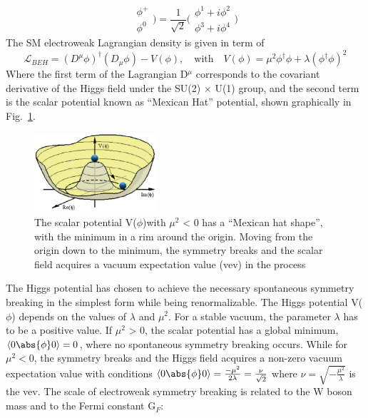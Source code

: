 \begin{itemize}
\begin{equation}
\begin{array}{c}
\phi^{+}\\
\phi^{0} \end{array}\Big)
= \frac{1}{\sqrt{2}}
\Big(\begin{array}{c}
\phi^{1} + i\phi^{2}\\
\phi^{3} + i\phi^{4}
\end{array}\Big)
\end{equation}
The SM electroweak Lagrangian density is given in term of
\begin{equation}\label{eq:beh_lagrange}
\mathcal{L}_{BEH} = (D^{\mu}\phi)^{\dagger}(D_{\mu}\phi) - V(\phi), \quad \textrm{with}\quad 
        V(\phi) = \mu^{2}\phi^{\dagger}\phi + \lambda(\phi^{\dagger}\phi)^{2}
\end{equation}
Where the first term of the Lagrangian D$^{\mu}$ corresponds to the covariant derivative of the Higgs field under the SU(2) $\times$ U(1) group, and the second term is the scalar potential known as ``Mexican Hat'' potential, shown graphically in Fig.~\ref{fig:mexican_hat}. 
\begin{figure}[h]
\centering
\captionsetup{width=0.8\linewidth}
\includegraphics[width=0.4\textwidth]{fig/sm_beyond/mexican_hat.png}
\caption{\label{fig:mexican_hat}The scalar potential V($\phi$)with $\mu^{2}$ < 0 has a ``Mexican hat shape'', with the minimum in a rim around the origin. Moving from the origin down to the minimum, the symmetry breaks and the scalar field acquires a vacuum expectation value (vev) in the process}
\end{figure}
The Higgs potential has chosen to achieve the necessary spontaneous symmetry breaking in the simplest form while being renormalizable. The Higgs potential V($\phi$) depends on the values of $\lambda$ and $\mu^{2}$. For a stable vacuum, the parameter $\lambda$ has to be a positive value. If $\mu^{2}$ > 0, the scalar potential has a global minimum, $\langle 0\abs{\phi}0\rangle = 0$, where no spontaneous symmetry breaking occurs. While for $\mu^{2} < 0$, the symmetry breaks and the Higgs field acquires a non-zero vacuum expectation value with conditions $\langle 0\abs{\phi}0\rangle = \frac{-\mu^{2}}{2\lambda} = \frac{\nu}{\sqrt{2}}$ where $\nu = \sqrt{-\frac{\mu^{2}}{\lambda}}$ is the vev. The scale of electroweak symmetry breaking is related to the W boson mass and to the Fermi constant G$_{F}$:

\end{itemize}
